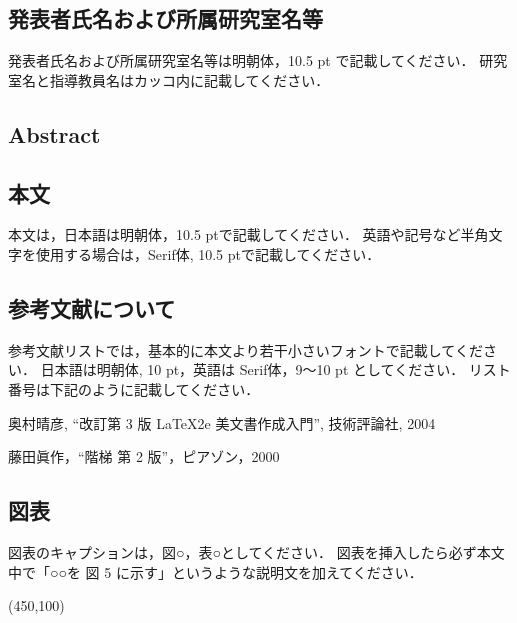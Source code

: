 \documentclass[titlepage]{jarticle}
\begin{document}
\subsection{発表者氏名および所属研究室名等}
%
発表者氏名および所属研究室名等は明朝体，10.5 pt で記載してください．
研究室名と指導教員名はカッコ内に記載してください．
%
%
\subsection{Abstract}
%

%
%
\subsection{本文}
%
本文は，日本語は明朝体，10.5 ptで記載してください．
英語や記号など半角文字を使用する場合は，Serif体, 10.5 ptで記載してください．
%
%
\subsection{参考文献について}
%

参考文献リストでは，基本的に本文より若干小さいフォントで記載してください．
日本語は明朝体, 10 pt，英語は Serif体，9〜10 pt としてください．
リスト番号は下記のように記載してください．
%
\renewcommand{\labelenumi}{[\arabic{enumi}]}
\begin{enumerate}
  \small{
  \item 奥村晴彦, ``改訂第 3 版 \LaTeX2e 美文書作成入門'', 技術評論社, 2004
  \item 藤田眞作，``\LaTeXe 階梯 第 2 版''，ピアゾン，2000
        }
\end{enumerate}
\renewcommand{\labelenumi}{\arabic{enumi}}
%
%
%
\subsection{図表}
%
図表のキャプションは，図○，表○としてください．
図表を挿入したら必ず本文中で「○○を 図 5 に示す」というような説明文を加えてください．
%
\begin{table*}[t!]
  \centering
  \caption{○○}
  \framebox(450,100){}
  \label{tab:ex_tab1}
\end{table*}
%
%
%
\end{document}
